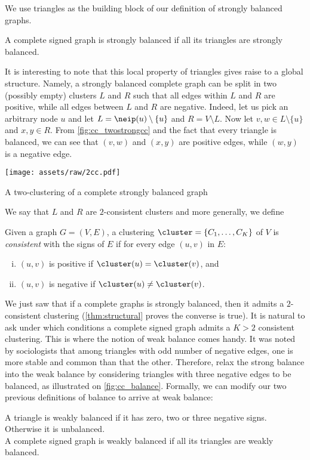We use triangles as the building block of our definition of strongly balanced graphs.
\begin{definition}
	A complete signed graph is strongly balanced if all its triangles are strongly balanced.
\end{definition}

It is interesting to note that this local property of triangles gives raise to a global structure.
Namely, a strongly balanced complete graph can be split in two (possibly empty) clusters $L$ and $R$
such that all edges within $L$ and $R$ are positive, while all edges between $L$ and $R$ are
negative. Indeed, let us pick an arbitrary node $u$ and let $L=\neip(u)\setminus \{u\}$ and $R=V\setminus L$. Now
let $v,w\in L\setminus \{u\}$ and $x,y\in R$. From \autoref{fig:cc_twostrongcc} and the fact that
every triangle is balanced, we can see that $(v,w)$ and $(x,y)$ are positive edges, while $(w,y)$ is
a negative edge.
\begin{marginfigure}
  \centering
  \texttt{[image: assets/raw/2cc.pdf]}
  \caption{A two-clustering of a complete strongly balanced graph}
  \label{fig:cc_twostrongcc}
\end{marginfigure}
We say that $L$ and $R$ are $2$-consistent clusters and more generally, we define
\begin{definition}
  Given a graph $G=(V, E)$, a clustering $\cluster=\{C_1, \ldots, C_K\}$ of $V$ is \emph{consistent}
  with the signs of $E$ if for every edge $(u,v)$ in $E$:
  \begin{enumerate}[(i),nosep]
    \item $(u,v)$ is positive if $\cluster(u)=\cluster(v)$, and
    \item $(u,v)$ is negative if $\cluster(u)\neq\cluster(v)$.
  \end{enumerate}
\end{definition}

We just saw that if a complete graphs is strongly balanced, then it admits a $2$-consistent
clustering (\autoref{thm:structural} proves the converse is true). It is natural to ask under which
conditions a complete signed graph admits a $K>2$ consistent clustering. This is where the notion of
weak balance comes handy. It was noted by
sociologists that among triangles with odd number of negative edges, one is more stable and common
than that the other. Therefore, \textcite{davis1967clustering} relax the strong balance into the
weak balance by considering triangles with three negative edges to be balanced, as illustrated on
\autoref{fig:cc_balance}. Formally, we can modify our two previous definitions of balance to arrive
at weak balance:
\begin{definition}\label{def:weak_balance}
	A triangle is weakly balanced if it has zero, two or three negative signs. Otherwise it is
	unbalanced. \\
	A complete signed graph is weakly balanced if all its triangles are weakly balanced.
\end{definition}

